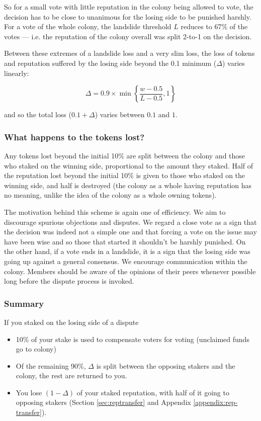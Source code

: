 So for a small vote with little reputation in the colony being allowed to vote, the decision has to be close to unanimous for the losing side to be punished harshly. For a vote of the whole colony, the landslide threshold $L$ reduces to 67\% of the votes --- i.e. the reputation of the colony overall was split 2-to-1 on the decision.

Between these extremes of a landslide loss and a very slim loss, the loss of tokens and reputation suffered by the losing side beyond the 0.1 minimum ($\Delta$) varies linearly:

\begin{equation}
 \Delta = 0.9 \times \min \left\lbrace \frac{w-0.5}{L-0.5}, 1 \right\rbrace    
\end{equation}

\noindent and so the total loss ($0.1 + \Delta$) varies between $0.1$ and $1$.

\subsubsection*{What happens to the tokens lost?}
Any tokens lost beyond the initial 10\% are split between the colony and those who staked on the winning side, proportional to the amount they staked. Half of the reputation lost beyond the initial 10\% is given to those who staked on the winning side, and half is destroyed (the colony as a whole having reputation has no meaning, unlike the idea of the colony as a whole owning tokens).

The motivation behind this scheme is again one of efficiency. We aim to discourage spurious objections and disputes. We regard a close vote as a sign that the decision was indeed not a simple one and that forcing a vote on the issue may have been wise and so those that started it shouldn't be harshly punished. On the other hand, if a vote ends in a landslide, it is a sign that the losing side was going up against a general consensus. We encourage communication within the colony. Members should be aware of the opinions of their peers whenever possible long before the dispute process is invoked.

\subsubsection*{Summary}
If you staked on the losing side of a dispute
\begin{itemize}
 \item 10\% of your stake is used to compensate voters for voting (unclaimed funds go to colony)
 \item Of the remaining 90\%, $\Delta$ is split between the opposing stakers and the colony, the rest are returned to you.
 \item You lose $(1-\Delta)$ of your staked reputation, with half of it going to opposing stakers (Section \ref{sec:reptransfer} and Appendix \ref{appendix:rep-transfer}).
\end{itemize}


